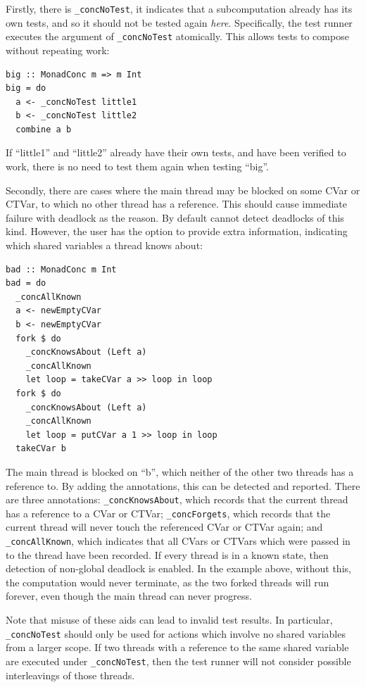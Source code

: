 Firstly, there is \texttt{\_concNoTest}, it indicates that a
subcomputation already has its own tests, and so it should not be
tested again \textit{here}. Specifically, the test runner executes the
argument of \texttt{\_concNoTest} atomically. This allows tests to
compose without repeating work:

\begin{verbatim}
big :: MonadConc m => m Int
big = do
  a <- _concNoTest little1
  b <- _concNoTest little2
  combine a b
\end{verbatim}

If ``little1'' and ``little2'' already have their own tests, and have
been verified to work, there is no need to test them again when
testing ``big''.

Secondly, there are cases where the main thread may be blocked on some
CVar or CTVar, to which no other thread has a reference. This should
cause immediate failure with deadlock as the reason. By default
\dejafu{} cannot detect deadlocks of this kind. However, the user has
the option to provide extra information, indicating which shared
variables a thread knows about:

\begin{verbatim}
bad :: MonadConc m Int
bad = do
  _concAllKnown
  a <- newEmptyCVar
  b <- newEmptyCVar
  fork $ do
    _concKnowsAbout (Left a)
    _concAllKnown
    let loop = takeCVar a >> loop in loop
  fork $ do
    _concKnowsAbout (Left a)
    _concAllKnown
    let loop = putCVar a 1 >> loop in loop
  takeCVar b
\end{verbatim}

The main thread is blocked on ``b'', which neither of the other two
threads has a reference to. By adding the annotations, this can be
detected and reported. There are three annotations:
\texttt{\_concKnowsAbout}, which records that the current thread has a
reference to a CVar or CTVar; \texttt{\_concForgets}, which records
that the current thread will never touch the referenced CVar or CTVar
again; and \texttt{\_concAllKnown}, which indicates that all CVars or
CTVars which were passed in to the thread have been recorded. If every
thread is in a known state, then detection of non-global deadlock is
enabled. In the example above, without this, the computation would
never terminate, as the two forked threads will run forever, even
though the main thread can never progress.

Note that misuse of these aids can lead to invalid test results. In
particular, \texttt{\_concNoTest} should only be used for actions
which involve no shared variables from a larger scope. If two threads
with a reference to the same shared variable are executed under
\texttt{\_concNoTest}, then the test runner will not consider possible
interleavings of those threads.

